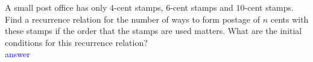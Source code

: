 \item{}
A small post office has only $4$-cent stamps, $6$-cent stamps and $10$-cent
stamps. Find a recurrence relation for the number of ways to form postage of $n$
cents with these stamps if the order that the stamps are used matters. What are
the initial conditions for this recurrence relation?\\[12pt]
\ifanswers
\textcolor{blue}{
answer
}
\newpage
\fi
